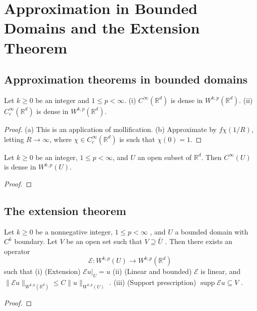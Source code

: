 \section{Approximation in Bounded Domains and the Extension Theorem}
\subsection{Approximation theorems in bounded domains}
\begin{theorem}
Let \(k \geq 0\) be an integer and \(1 \leq p < \infty\).
(i) \(C^{\infty}(\mathbb{R}^{d})\) is dense in \(W^{k,p}(\mathbb{R}^{d})\).
(ii) \(C^{\infty}_{c}(\mathbb{R}^{d})\) is dense in \(W^{k,p}(\mathbb{R}^{d})\).
\end{theorem}

\begin{proof}
(a) This is an application of mollification.
(b) Approximate by \(f\chi(1/R)\), letting \(R \to \infty\), where \(\chi \in C^{\infty}_{c}(\mathbb{R}^{d})\) is such that \(\chi(0) = 1\).
\end{proof}

\begin{theorem}
Let \(k \geq 0\) be an integer, \(1 \leq p < \infty\), and \(U\) an open subset of \(\mathbb{R}^{d}\). Then \(C^{\infty}(U)\) is dense in \(W^{k,p}(U)\).
\end{theorem}

\begin{proof}
    
\end{proof}

\subsection{The extension theorem}
\begin{theorem}
Let \(k\geq 0\) be a nonnegative integer, \(1\leq p< \infty\) , and \(U\) a bounded domain with \(C^k\) boundary. Let \(V\) be an open set such that \(V\supseteq \bar{U}\) . Then there exists an operator
\[
\mathcal{E}:W^{k,p}(U)\to W^{k,p}(\mathbb{R}^{d})
\]
such that
(i) (Extension) \(\mathcal{E}u|_U = u\)
(ii) (Linear and bounded) \(\mathcal{E}\) is linear, and \(\| \mathcal{E}u\|_{W^{k,p}(\mathbb{R}^{d})} \leq C\| u\|_{W^{k,p}(U)}\) .
(iii) (Support prescription) \(\operatorname{supp} \mathcal{E}u \subseteq V\) .
\end{theorem}

\begin{proof}

\end{proof}

